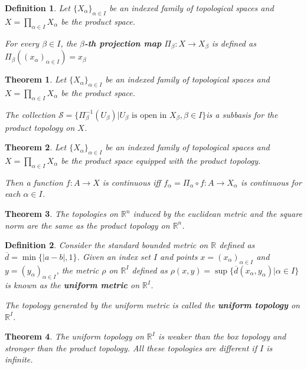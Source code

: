 \documentclass[14pt,twoside]{extreport}
\theoremstyle{dotless}
\newtheorem*{defn}{Definition}
\newtheorem*{thm}{Theorem} %
\begin{document}
\begin{defn}
    Let $\{ X_\alpha \}_{\alpha \in I}$ be an indexed family of topological spaces and $X = \prod_{\alpha \in I} X_\alpha$ be the product space. 

    For every $\beta \in I$, the \textbf{$\beta$-th projection map} $\Pi_\beta: X \to X_\beta$ is defined as $\Pi_\beta ( (x_\alpha)_{\alpha \in I} ) = x_\beta$
\end{defn}

\begin{thm}
Let $\{ X_\alpha \}_{\alpha \in I}$ be an indexed family of topological spaces and $X = \prod_{\alpha \in I} X_\alpha$ be the product space. 

    The collection $\mathscr{S} = \{ \Pi^{-1}_\beta (U_\beta) | U_\beta \text{ is open in } X_\beta, \beta \in I \}$is a subbasis for the product topology on $X$.
\end{thm}

\begin{thm}
Let $\{ X_\alpha \}_{\alpha \in I}$ be an indexed family of topological spaces and $X = \prod_{\alpha \in I} X_\alpha$ be the product space equipped with the product topology.

    Then a function $f: A \to X$ is continuous iff $f_\alpha = \Pi_\alpha \circ f : A \to X_\alpha$ is continuous for each $\alpha \in I$.
\end{thm}

\begin{thm}
    The topologies on $\mathbb{R}^n$ induced by the euclidean metric and the square norm are the same as the product topology on $\mathbb{R}^n$.
\end{thm}

\begin{defn}
    Consider the standard bounded metric on $\mathbb{R}$ defined as $\overline{d} = \min\{ |a-b|, 1\}$.
    Given an index set $I$ and points $x = (x_\alpha)_{\alpha \in I}$ and $y = (y_\alpha)_{\alpha \in I}$, the metric $\rho$ on $\mathbb{R}^I$ defined  as $\rho(x,y) = \sup \{ \overline{d}(x_\alpha, y_\alpha) | \alpha \in I \}$ is known as the \textbf{uniform metric} on $\mathbb{R}^I$.

    The topology generated by the uniform metric is called the \textbf{uniform topology} on $\mathbb{R}^I$.
\end{defn}

\begin{thm}
    The uniform topology on $\mathbb{R}^I$ is weaker than the box topology and stronger than the product topology. 
    All these topologies are different if $I$ is infinite.
\end{thm}
\end{document}
